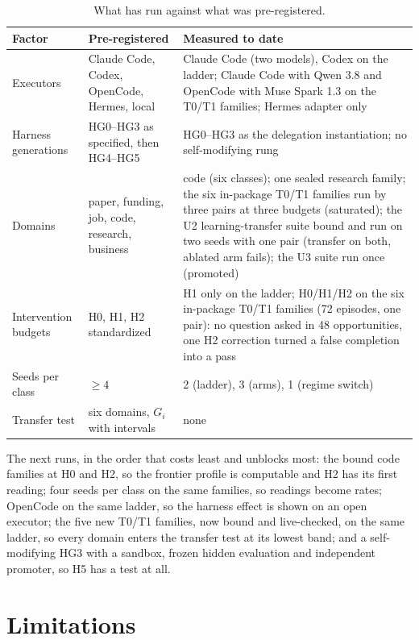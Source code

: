 \begin{table}[!htbp]
\centering\small
\begin{tabularx}{\textwidth}{@{}lYY@{}}
\toprule
Factor & Pre-registered & Measured to date \\
\midrule
Executors & Claude Code, Codex, OpenCode, Hermes, local & Claude Code (two models), Codex on the ladder; Claude Code with Qwen 3.8 and OpenCode with Muse Spark 1.3 on the T0/T1 families; Hermes adapter only \\
Harness generations & HG0--HG3 as specified, then HG4--HG5 & HG0--HG3 as the delegation instantiation; no self-modifying rung \\
Domains & paper, funding, job, code, research, business & code (six classes); one sealed research family; the six in-package T0/T1 families run by three pairs at three budgets (saturated); the U2 learning-transfer suite bound and run on two seeds with one pair (transfer on both, ablated arm fails); the U3 suite run once (promoted) \\
Intervention budgets & H0, H1, H2 standardized & H1 only on the ladder; H0/H1/H2 on the six in-package T0/T1 families (72 episodes, one pair): no question asked in 48 opportunities, one H2 correction turned a false completion into a pass \\
Seeds per class & $\ge 4$ & 2 (ladder), 3 (arms), 1 (regime switch) \\
Transfer test & six domains, $G_i$ with intervals & none \\
\bottomrule
\end{tabularx}
\caption{What has run against what was pre-registered.}
\label{tab:coverage}
\end{table}

The next runs, in the order that costs least and unblocks most: the bound code families at H0 and H2, so the frontier profile is computable and H2 has its first reading; four seeds per class on the same families, so readings become rates; OpenCode on the same ladder, so the harness effect is shown on an open executor; the five new T0/T1 families, now bound and live-checked, on the same ladder, so every domain enters the transfer test at its lowest band; and a self-modifying HG3 with a sandbox, frozen hidden evaluation and independent promoter, so H5 has a test at all.

\section{Limitations}\label{sec:limits}

